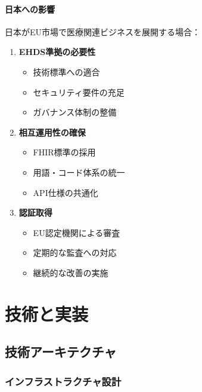 \documentclass[
  a4paper,
  a4paper,
  11pt]{ltjsbook}
\providecommand{\tightlist}{%
  \setlength{\itemsep}{0pt}\setlength{\parskip}{0pt}}
\begin{document}
\subsection{日本への影響}\label{ux65e5ux672cux3078ux306eux5f71ux97ff}

日本がEU市場で医療関連ビジネスを展開する場合：

\begin{enumerate}
\def\labelenumi{\arabic{enumi}.}
\tightlist
\item
  \textbf{EHDS準拠の必要性}

  \begin{itemize}
  \tightlist
  \item
    技術標準への適合
  \item
    セキュリティ要件の充足
  \item
    ガバナンス体制の整備
  \end{itemize}
\item
  \textbf{相互運用性の確保}

  \begin{itemize}
  \tightlist
  \item
    FHIR標準の採用
  \item
    用語・コード体系の統一
  \item
    API仕様の共通化
  \end{itemize}
\item
  \textbf{認証取得}

  \begin{itemize}
  \tightlist
  \item
    EU認定機関による審査
  \item
    定期的な監査への対応
  \item
    継続的な改善の実施
  \end{itemize}
\end{enumerate}

\part{技術と実装}

\chapter{技術アーキテクチャ}\label{ux6280ux8853ux30a2ux30fcux30adux30c6ux30afux30c1ux30e3}

\section{インフラストラクチャ設計}\label{ux30a4ux30f3ux30d5ux30e9ux30b9ux30c8ux30e9ux30afux30c1ux30e3ux8a2dux8a08}
\end{document}
